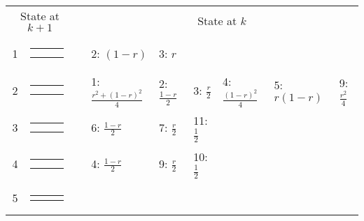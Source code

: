 \begin{center}
\begin{tabular}{cccllllll} \hline
\multicolumn{2}{c}{State at $k+1$} & &
\multicolumn{6}{c}{State at $k$} \\
\cline{1-2} \cline{4-9}
1 &
{\renewcommand{\arraystretch}{0.3}
\renewcommand{\tabcolsep}{0.5mm}
\parbox[b][3mm][c]{12mm}{
\begin{tabular}{|p{2mm}|p{2mm}||p{2mm}|} \hline
$\bullet$ & $\bullet$ &           \\
$\bullet$ & $\bullet$ &           \\ \hline
\end{tabular}}}
&
& 2: $(1-r)$
& 3: $r$
& & & & \\
2 &
{\renewcommand{\arraystretch}{0.3}
\renewcommand{\tabcolsep}{0.5mm}
\parbox[b][3mm][c]{12mm}{
\begin{tabular}{|p{2mm}|p{2mm}||p{2mm}|} \hline
$\bullet$ &           & $\bullet$ \\
$\bullet$ &           & $\bullet$ \\ \hline
\end{tabular}}}
&
& 1: $\frac{r^2+(1-r)^2}{4}$
& 2: $\frac{1-r}{2}$
& 3: $\frac{r}{2}$
& 4: $\frac{(1-r)^2}{4}$
& 5: $r(1-r)$
& 9: $\frac{r^2}{4}$
\\
3 &
{\renewcommand{\arraystretch}{0.3}
\renewcommand{\tabcolsep}{0.5mm}
\parbox[b][3mm][c]{12mm}{
\begin{tabular}{|p{2mm}|p{2mm}||p{2mm}|} \hline
$\bullet$ &           & $\bullet$ \\
          & $\bullet$ & $\bullet$ \\ \hline
\end{tabular}}}
&
& 6: $\frac{1-r}{2}$
& 7: $\frac{r}{2}$
& 11: $\frac{1}{2}$
& & & \\
4 &
{\renewcommand{\arraystretch}{0.3}
\renewcommand{\tabcolsep}{0.5mm}
\parbox[b][3mm][c]{12mm}{
\begin{tabular}{|p{2mm}|p{2mm}||p{2mm}|} \hline
$\bullet$ &           &           \\
$\bullet$ &           &           \\ \hline
\end{tabular}}}
&
& 4: $\frac{1-r}{2}$
& 9: $\frac{r}{2}$
& 10: $\frac{1}{2}$
& & & \\
5 &
{\renewcommand{\arraystretch}{0.3}
\renewcommand{\tabcolsep}{0.5mm}
\parbox[b][3mm][c]{12mm}{
\begin{tabular}{|p{2mm}|p{2mm}||p{2mm}|} \hline
$\bullet$ & $\bullet$ &           \\

\end{tabular}}}
\end{tabular}
\end{center}
